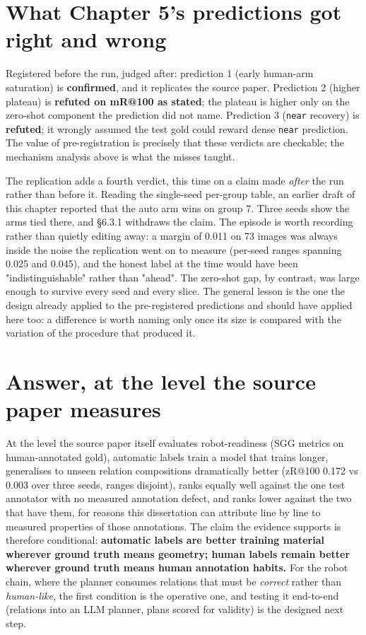 \section{What Chapter 5's predictions got right and wrong}

Registered before the run, judged after: prediction 1 (early human-arm saturation) is \textbf{confirmed}, and it replicates the source paper. Prediction 2 (higher plateau) is \textbf{refuted on mR@100 as stated}; the plateau is higher only on the zero-shot component the prediction did not name. Prediction 3 (\texttt{near} recovery) is \textbf{refuted}; it wrongly assumed the test gold could reward dense \texttt{near} prediction. The value of pre-registration is precisely that these verdicts are checkable; the mechanism analysis above is what the misses taught.

The replication adds a fourth verdict, this time on a claim made \textit{after} the run rather than before it. Reading the single-seed per-group table, an earlier draft of this chapter reported that the auto arm wins on group 7. Three seeds show the arms tied there, and \S6.3.1 withdraws the claim. The episode is worth recording rather than quietly editing away: a margin of 0.011 on 73 images was always inside the noise the replication went on to measure (per-seed ranges spanning 0.025 and 0.045), and the honest label at the time would have been "indistinguishable" rather than "ahead". The zero-shot gap, by contrast, was large enough to survive every seed and every slice. The general lesson is the one the design already applied to the pre-registered predictions and should have applied here too: a difference is worth naming only once its size is compared with the variation of the procedure that produced it.

\section{Answer, at the level the source paper measures}

At the level the source paper itself evaluates robot-readiness (SGG metrics on human-annotated gold), automatic labels train a model that trains longer, generalises to unseen relation compositions dramatically better (zR@100 0.172 vs 0.003 over three seeds, ranges disjoint), ranks equally well against the one test annotator with no measured annotation defect, and ranks lower against the two that have them, for reasons this dissertation can attribute line by line to measured properties of those annotations. The claim the evidence supports is therefore conditional: \textbf{automatic labels are better training material wherever ground truth means geometry; human labels remain better wherever ground truth means human annotation habits.} For the robot chain, where the planner consumes relations that must be \textit{correct} rather than \textit{human-like}, the first condition is the operative one, and testing it end-to-end (relations into an LLM planner, plans scored for validity) is the designed next step.